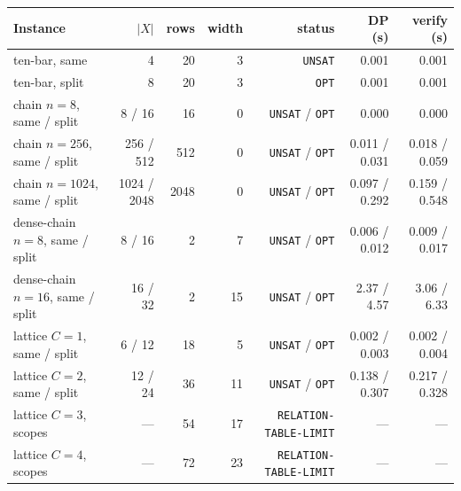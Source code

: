 \documentclass[11pt]{article}
\theoremstyle{plain}
\theoremstyle{definition}
\theoremstyle{remark}
\begin{document}
\begin{center}
\footnotesize
\setlength{\tabcolsep}{4pt}
\begin{tabular}{@{}lrrrrrr@{}}
\toprule
Instance & \(\lvert X\rvert\) & rows & width & status & DP (s) & verify (s)\\
\midrule
ten-bar, same & 4 & 20 & 3 & \texttt{UNSAT} & 0.001 & 0.001\\
ten-bar, split & 8 & 20 & 3 & \texttt{OPT} & 0.001 & 0.001\\
chain \(n{=}8\), same / split & 8 / 16 & 16 & 0 & \texttt{UNSAT} / \texttt{OPT} & 0.000 & 0.000\\
chain \(n{=}256\), same / split & 256 / 512 & 512 & 0 & \texttt{UNSAT} / \texttt{OPT} & 0.011 / 0.031 & 0.018 / 0.059\\
chain \(n{=}1024\), same / split & 1024 / 2048 & 2048 & 0 & \texttt{UNSAT} / \texttt{OPT} & 0.097 / 0.292 & 0.159 / 0.548\\
dense-chain \(n{=}8\), same / split & 8 / 16 & 2 & 7 & \texttt{UNSAT} / \texttt{OPT} & 0.006 / 0.012 & 0.009 / 0.017\\
dense-chain \(n{=}16\), same / split & 16 / 32 & 2 & 15 & \texttt{UNSAT} / \texttt{OPT} & 2.37 / 4.57 & 3.06 / 6.33\\
lattice \(C{=}1\), same / split & 6 / 12 & 18 & 5 & \texttt{UNSAT} / \texttt{OPT} & 0.002 / 0.003 & 0.002 / 0.004\\
lattice \(C{=}2\), same / split & 12 / 24 & 36 & 11 & \texttt{UNSAT} / \texttt{OPT} & 0.138 / 0.307 & 0.217 / 0.328\\
lattice \(C{=}3\), scopes & --- & 54 & 17 & \texttt{RELATION-TABLE-LIMIT} & --- & ---\\
lattice \(C{=}4\), scopes & --- & 72 & 23 & \texttt{RELATION-TABLE-LIMIT} & --- & ---\\
\bottomrule
\end{tabular}
\label{tab:mechanics-benchmarks}
\end{center}
\end{document}
